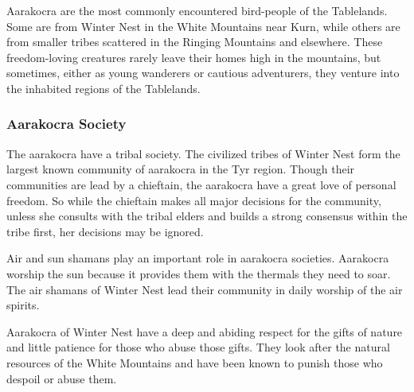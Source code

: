 Aarakocra are the most commonly encountered bird-people of the Tablelands. Some are from Winter Nest in the White Mountains near Kurn, while others are from smaller tribes scattered in the Ringing Mountains and elsewhere. These freedom-loving creatures rarely leave their homes high in the mountains, but sometimes, either as young wanderers or cautious adventurers, they venture into the inhabited regions of the Tablelands.

\subsubsection{Aarakocra Society}
The aarakocra have a tribal society. The civilized tribes of Winter Nest form the largest known community of aarakocra in the Tyr region. Though their communities are lead by a chieftain, the aarakocra have a great love of personal freedom. So while the chieftain makes all major decisions for the community, unless she consults with the tribal elders and builds a strong consensus within the tribe first, her decisions may be ignored.

Air and sun shamans play an important role in aarakocra societies. Aarakocra worship the sun because it provides them with the thermals they need to soar. The air shamans of Winter Nest lead their community in daily worship of the air spirits.

Aarakocra of Winter Nest have a deep and abiding respect for the gifts of nature and little patience for those who abuse those gifts. They look after the natural resources of the White Mountains and have been known to punish those who despoil or abuse them.

